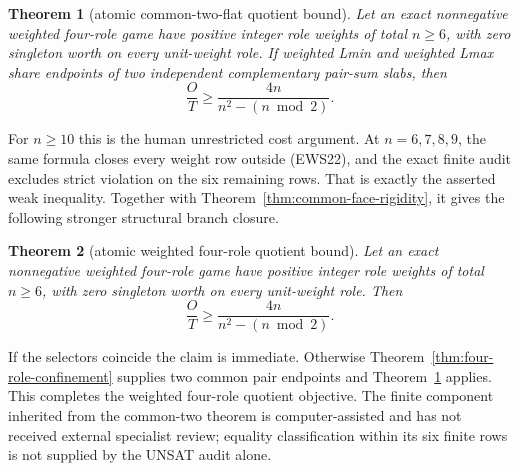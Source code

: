 \documentclass[11pt]{article}
\newtheorem{theorem}{Theorem}
\begin{document}
\begin{theorem}[atomic common-two-flat quotient bound]\label{thm:common-two-atomic}
Let an exact nonnegative weighted four-role game have positive integer role
weights of total $n\geq6$, with zero singleton worth on every unit-weight
role.  If weighted Lmin and weighted Lmax share endpoints of two independent
complementary pair-sum slabs, then
\[
 \frac OT\geq\frac{4n}{n^2-(n\bmod2)}.
\]
\end{theorem}

For $n\geq10$ this is the human unrestricted cost argument.  At
$n=6,7,8,9$, the same formula closes every weight row outside (EWS22), and
the exact finite audit excludes strict violation on the six remaining rows.
That is exactly the asserted weak inequality.  Together with
Theorem~\ref{thm:common-face-rigidity}, it gives the following stronger
structural branch closure.
\begin{theorem}[atomic weighted four-role quotient bound]
\label{thm:atomic-four-role}
Let an exact nonnegative weighted four-role game have positive integer role
weights of total $n\ge6$, with zero singleton worth on every unit-weight
role.  Then
\[
 \frac OT\ge\frac{4n}{n^2-(n\bmod2)}.
\]
\end{theorem}

If the selectors coincide the claim is immediate.  Otherwise
Theorem~\ref{thm:four-role-confinement} supplies two common pair endpoints and
Theorem~\ref{thm:common-two-atomic} applies.  This completes the weighted
four-role quotient objective.  The finite component inherited from the
common-two theorem is computer-assisted and has not received external
specialist review; equality classification within its six finite rows is
not supplied by the UNSAT audit alone.
\end{document}
